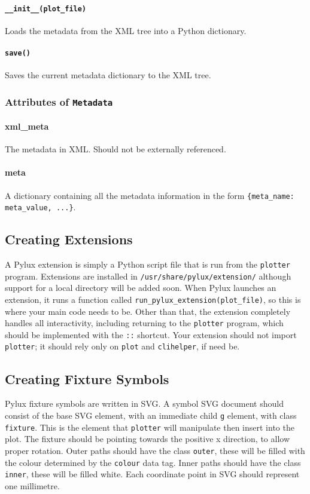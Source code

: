 \documentclass[a4paper]{article}
\begin{document}
\paragraph{\texttt{\_\_init\_\_(plot\_file)}}
Loads the metadata from the XML tree into a Python dictionary.

\paragraph{\texttt{save()}}
Saves the current metadata dictionary to the XML tree.

\subsubsection{Attributes of \texttt{Metadata}}

\paragraph{xml\_meta}
The metadata in XML. Should not be externally referenced.

\paragraph{meta}
A dictionary containing all the metadata information in the form 
\texttt{\{meta\_name: meta\_value, ...\}}.

\subsection{Creating Extensions}
A Pylux extension is simply a Python script file that is run from the 
\texttt{plotter} program. Extensions are installed in 
\texttt{/usr/share/pylux/extension/} although support for a local 
directory will be added soon. When Pylux launches an extension, it runs a 
function called \texttt{run\_pylux\_extension(plot\_file)}, so this is 
where your main code needs to be. Other than that, the extension 
completely handles all interactivity, including returning to the 
\texttt{plotter} program, which should be implemented with the \texttt{::} 
shortcut. Your extension should not import \texttt{plotter}; it should 
rely only on \texttt{plot} and \texttt{clihelper}, if need be.

\subsection{Creating Fixture Symbols}
Pylux fixture symbols are written in SVG. A symbol SVG document should 
consist of the base SVG element, with an immediate child \texttt{g} element, 
with class \texttt{fixture}. This is the element that \texttt{plotter} will 
manipulate then insert into the plot. The fixture should be pointing towards 
the positive x direction, to allow proper rotation. Outer paths should have 
the class \texttt{outer}, these will be filled with the colour determined by 
the \texttt{colour} data tag. Inner paths should have the class 
\texttt{inner}, these will be filled white. Each coordinate point in SVG 
should represent one millimetre.
\end{document}

